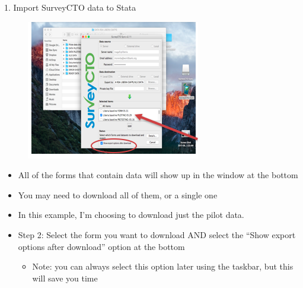 \documentclass[aspectratio=169]{beamer}
\begin{document}
\begin{frame}[fragile]{1. Import SurveyCTO data to Stata}
\begin{multicols}{2}	
	\begin{figure}
		\centering
		\includegraphics[width=\linewidth]{img/scto2}
	\end{figure}
	\begin{itemize}
		\item All of the forms that contain data will show up in the window at the bottom
		\item You may need to download all of them, or a single one
		\item In this example, I’m choosing to download just the pilot data. 
		\item Step 2: Select the form you want to download AND select the “Show export options after download” option at the bottom
			\begin{itemize}
				\item Note: you can always select this option later using the taskbar, but this will save you time
			\end{itemize}		 
	\end{itemize}
\end{multicols}
\end{frame}
\end{document}
